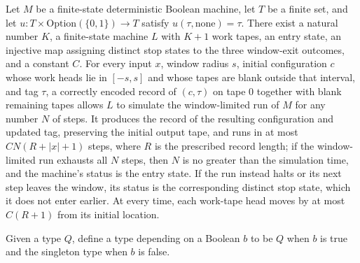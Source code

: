 \begin{theorem}
\label{Turing.exists_windowLoopTM}
\leanok
{}
Let $M$ be a finite-state deterministic Boolean machine, let $T$ be a finite set, and
let $u:T\times\mathrm{Option}(\{0,1\})\to T$ satisfy $u(\tau,\mathrm{none})=\tau$. There
exist a natural number $K$, a finite-state machine $L$ with $K+1$ work tapes, an entry
state, an injective map assigning distinct stop states to the three window-exit
outcomes, and a constant $C$. For every input $x$, window radius $s$, initial
configuration $c$ whose work heads lie in $[-s,s]$ and whose tapes are blank outside
that interval, and tag $\tau$, a correctly encoded record of $(c,\tau)$ on tape 0
together with blank remaining tapes allows $L$ to simulate the window-limited run of $M$
for any number $N$ of steps. It produces the record of the resulting configuration and
updated tag, preserving the initial output tape, and runs in at most $C N(R+|x|+1)$
steps, where $R$ is the prescribed record length; if the window-limited run exhausts all
$N$ steps, then $N$ is no greater than the simulation time, and the machine's status is
the entry state. If the run instead halts or its next step leaves the window, its status
is the corresponding distinct stop state, which it does not enter earlier. At every
time, each work-tape head moves by at most $C(R+1)$ from its initial location.
\end{theorem}

\begin{definition}
\label{Turing.wr_Ctrl}
\leanok
Given a type $Q$, define a type depending on a Boolean $b$ to be $Q$ when $b$ is true
and the singleton type when $b$ is false.
\end{definition}

